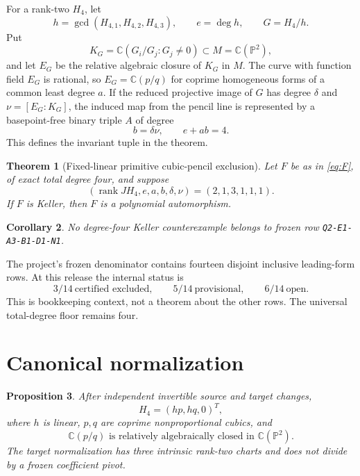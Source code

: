 \documentclass[11pt]{article}
\newtheorem{theorem}{Theorem}
\newtheorem{proposition}[theorem]{Proposition}
\newtheorem{corollary}[theorem]{Corollary}
\theoremstyle{remark}
\newcommand{\C}{\mathbb C}
\newcommand{\PP}{\mathbb P}
\newcommand{\rank}{\operatorname{rank}}
\begin{document}
For a rank-two $H_4$, let
\[
 h=\gcd(H_{4,1},H_{4,2},H_{4,3}),\qquad e=\deg h,\qquad G=H_4/h.
\]
Put
\[
 K_G=\C(G_i/G_j:G_j\ne0)\subset M=\C(\PP^2),
\]
and let $E_G$ be the relative algebraic closure of $K_G$ in $M$.  The curve
with function field $E_G$ is rational, so $E_G=\C(p/q)$ for coprime
homogeneous forms of a common least degree $a$.  If the reduced projective
image of $G$ has degree $\delta$ and $\nu=[E_G:K_G]$, the induced map from
the pencil line is represented by a basepoint-free binary triple $A$ of
degree
\begin{equation}
 b=\delta\nu,\qquad e+ab=4.                           \label{eq:arithmetic}
\end{equation}
This defines the invariant tuple in the theorem.

\begin{theorem}[Fixed-linear primitive cubic-pencil exclusion]
\label{thm:main}
Let $F$ be as in \eqref{eq:F}, of exact total degree four, and suppose
\[
 (\rank JH_4,e,a,b,\delta,\nu)=(2,1,3,1,1,1).
\]
If $F$ is Keller, then $F$ is a polynomial automorphism.
\end{theorem}

\begin{corollary}
No degree-four Keller counterexample belongs to frozen row
\texttt{Q2-E1-A3-B1-D1-N1}.
\end{corollary}

The project's frozen denominator contains fourteen disjoint inclusive
leading-form rows.  At this release the internal status is
\[
 3/14\ \text{certified excluded},\qquad
 5/14\ \text{provisional},\qquad
 6/14\ \text{open}.
\]
This is bookkeeping context, not a theorem about the other rows.  The
universal total-degree floor remains four.

\section{Canonical normalization}

\begin{proposition}\label{prop:normal}
After independent invertible source and target changes,
\begin{equation}
 H_4=(hp,hq,0)^T,                                    \label{eq:normal}
\end{equation}
where $h$ is linear, $p,q$ are coprime nonproportional cubics, and
\begin{equation}
 \C(p/q)\text{ is relatively algebraically closed in }\C(\PP^2).
 \label{eq:minimal}
\end{equation}
The target normalization has three intrinsic rank-two charts and does not
divide by a frozen coefficient pivot.
\end{proposition}
\end{document}
